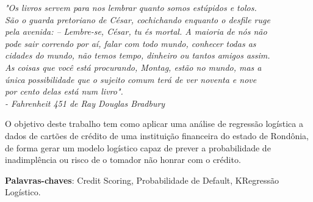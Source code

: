 \documentclass[
	12pt,				%
	openright,			%
	oneside,      %
	a4paper,			%
	english,			%
	french,				%
	spanish,			%
	brazil,				%
	]{abntex2}\usepackage[]{graphicx}\usepackage[table]{xcolor}
\theoremstyle{definition}
\begin{document}

\frenchspacing


\imprimircapa

\imprimirfolhaderosto
\clearpage

\begin{epigrafe} 
  \vspace*{\fill} 
  \begin{flushright} 
  \textit{"Os livros servem para nos lembrar quanto somos estúpidos e tolos. 
      \\ São o guarda pretoriano de César, cochichando enquanto o desfile ruge 
      \\ pela avenida: – Lembre-se, César, tu és mortal. A maioria de nós não 
      \\ pode sair correndo por aí, falar com todo mundo, conhecer todas as 
      \\ cidades do mundo, não temos tempo, dinheiro ou tantos amigos assim. 
      \\ As coisas que você está procurando, Montag, estão no mundo, mas a 
      \\ única possibilidade que o sujeito comum terá de ver noventa e nove 
      \\ por cento delas está num livro". 
      \\ - Fahrenheit 451 de Ray Douglas Bradbury} 
  \end{flushright} 
\end{epigrafe}

\begin{resumo} 
  O objetivo deste trabalho tem como aplicar uma análise de regressão logística a dados
  de cartões de crédito de uma instituição financeira do estado de Rondônia, de forma
  gerar um modelo logístico capaz de prever a probabilidade de inadimplência ou risco
  de o tomador não honrar com o crédito.
  \vspace{\onelineskip} 
  \noindent
  
  \textbf{Palavras-chaves}: Credit Scoring, Probabilidade de Default, KRegressão Logístico. 
\end{resumo}
\end{document}
